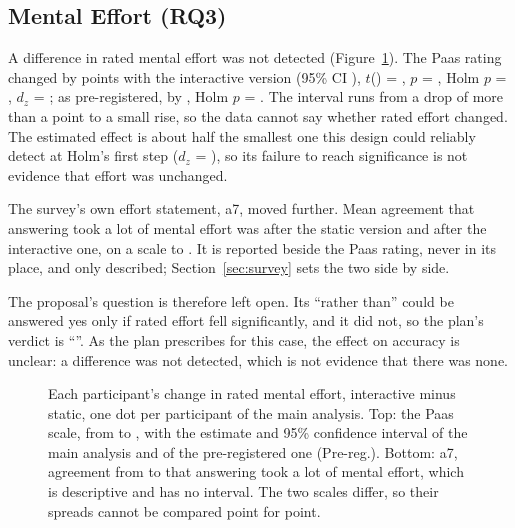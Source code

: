 \documentclass[10pt,twocolumn]{article}
\begin{document}
\subsection{Mental Effort (RQ3)}
\label{sec:effort}

A difference in rated mental effort was not detected (Figure~\ref{fig:effort}). The Paas rating changed by  points with the interactive version (95\% CI ), $t$() = , $p$ = , Holm $p$ = , $d_z$ = ; as pre-registered, by  , Holm $p$ = . The interval runs from a drop of more than a point to a small rise, so the data cannot say whether rated effort changed. The estimated effect is about half the smallest one this design could reliably detect at Holm's first step ($d_z$ = ), so its failure to reach significance is not evidence that effort was unchanged.

The survey's own effort statement, a7, moved further. Mean agreement that answering took a lot of mental effort was  after the static version and  after the interactive one, on a scale to . It is reported beside the Paas rating, never in its place, and only described; Section~\ref{sec:survey} sets the two side by side.

The proposal's question is therefore left open. Its ``rather than'' could be answered yes only if rated effort fell significantly, and it did not, so the plan's verdict is ``''. As the plan prescribes for this case, the effect on accuracy is unclear: a difference was not detected, which is not evidence that there was none.

\begin{figure}[t]
    \centering
    
    \caption{
        Each participant's change in rated mental effort, interactive minus static, one dot per participant of the main analysis. Top: the Paas scale, from  to , with the estimate and 95\% confidence interval of the main analysis and of the pre-registered one (Pre-reg.). Bottom: a7, agreement from  to  that answering took a lot of mental effort, which is descriptive and has no interval. The two scales differ, so their spreads cannot be compared point for point.
    }
    \label{fig:effort}
\end{figure}
\end{document}
